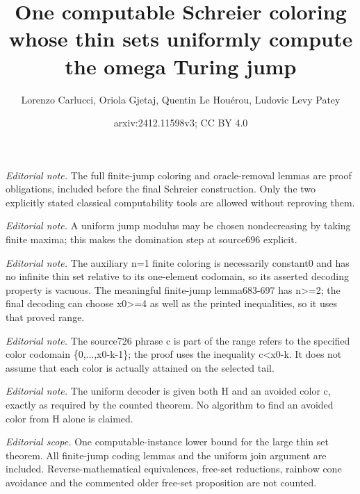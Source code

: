 \documentclass[10pt,a4paper]{article}
\title{One computable Schreier coloring whose thin sets uniformly compute the omega Turing jump}
\author{Lorenzo Carlucci, Oriola Gjetaj, Quentin Le Houérou, Ludovic Levy Patey}
\date{arxiv:2412.11598v3; CC BY 4.0}
\numberwithin{theorem}{section}
\begin{document}
\maketitle
\noindent\textit{Editorial note.} The full finite-jump coloring and oracle-removal lemmas are proof obligations, included before the final Schreier construction. Only the two explicitly stated classical computability tools are allowed without reproving them.\par\medskip
\noindent\textit{Editorial note.} A uniform jump modulus may be chosen nondecreasing by taking finite maxima; this makes the domination step at source696 explicit.\par\medskip
\noindent\textit{Editorial note.} The auxiliary n=1 finite coloring is necessarily constant0 and has no infinite thin set relative to its one-element codomain, so its asserted decoding property is vacuous. The meaningful finite-jump lemma683-697 has n>=2; the final decoding can choose x0>=4 as well as the printed inequalities, so it uses that proved range.\par\medskip
\noindent\textit{Editorial note.} The source726 phrase c is part of the range refers to the specified color codomain \{0,...,x0-k-1\}; the proof uses the inequality c<x0-k. It does not assume that each color is actually attained on the selected tail.\par\medskip
\noindent\textit{Editorial note.} The uniform decoder is given both H and an avoided color c, exactly as required by the counted theorem. No algorithm to find an avoided color from H alone is claimed.\par\medskip
\noindent\textit{Editorial scope.} One computable-instance lower bound for the large thin set theorem. All finite-jump coding lemmas and the uniform join argument are included. Reverse-mathematical equivalences, free-set reductions, rainbow cone avoidance and the commented older free-set proposition are not counted.\par\medskip
\end{document}

